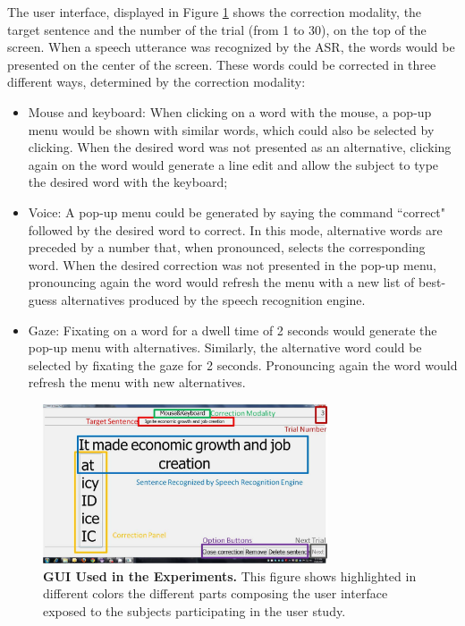 \documentclass[]{article}
\begin{document}
The user interface, displayed in Figure \ref{guiExampleEdited} shows the correction modality, the target
sentence and the number of the trial (from 1 to 30), on the top of the screen. When a speech utterance was recognized by the ASR,
the words would be presented on the center of the screen. These words could be corrected in three different ways,
determined by the correction modality:
\begin{itemize}
  \item Mouse and keyboard: When clicking on a word with the mouse, a pop-up menu would be shown with similar words, 
  which could also be selected by clicking. When the desired word was not presented as an alternative, clicking again on 
  the word would generate a line edit and allow the subject to type the desired word with the keyboard;
  \item Voice: A pop-up menu could be generated by saying the command ``correct" followed by the desired word to correct. 
  In this mode, alternative words are preceded by a number that, when pronounced, selects the corresponding word. When 
  the desired correction was not presented in the pop-up menu, pronouncing again the word would refresh the menu with a 
  new list of best-guess alternatives produced by the speech recognition engine.
  \item Gaze: Fixating on a word for a dwell time of 2 seconds would generate the pop-up menu with alternatives. 
  Similarly, the alternative word could be selected by fixating the gaze for 2 seconds. Pronouncing again the word would 
  refresh the menu with new alternatives.
\end{itemize}


\begin{figure}[ht]
\begin{center}
\includegraphics[width=0.75\textwidth]{figures/guiExampleEdited.jpg}
\end{center}
\caption{\textbf{GUI Used in the Experiments.} This figure shows highlighted in different colors the different parts 
composing the user interface exposed to the subjects participating in the user study.}
\label{guiExampleEdited}
\end{figure}
\end{document}

